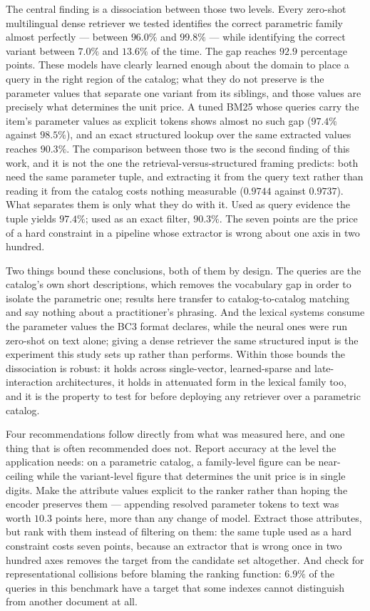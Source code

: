 \documentclass[preprint,12pt]{elsarticle}
\begin{document}
The central finding is a dissociation between those two levels. Every zero-shot multilingual dense retriever we tested identifies the correct parametric family almost perfectly --- between $96.0\%$ and $99.8\%$ --- while identifying the correct variant between $7.0\%$ and $13.6\%$ of the time. The gap reaches $92.9$ percentage points. These models have clearly learned enough about the domain to place a query in the right region of the catalog; what they do not preserve is the parameter values that separate one variant from its siblings, and those values are precisely what determines the unit price. A tuned BM25 whose queries carry the item's parameter values as explicit tokens shows almost no such gap ($97.4\%$ against $98.5\%$), and an exact structured lookup over the same extracted values reaches $90.3\%$. The comparison between those two is the second finding of this work, and it is not the one the retrieval-versus-structured framing predicts: both need the same parameter tuple, and extracting it from the query text rather than reading it from the catalog costs nothing measurable ($0.9744$ against $0.9737$). What separates them is only what they do with it. Used as query evidence the tuple yields $97.4\%$; used as an exact filter, $90.3\%$. The seven points are the price of a hard constraint in a pipeline whose extractor is wrong about one axis in two hundred.

Two things bound these conclusions, both of them by design. The queries are the catalog's own short descriptions, which removes the vocabulary gap in order to isolate the parametric one; results here transfer to catalog-to-catalog matching and say nothing about a practitioner's phrasing. And the lexical systems consume the parameter values the BC3 format declares, while the neural ones were run zero-shot on text alone; giving a dense retriever the same structured input is the experiment this study sets up rather than performs. Within those bounds the dissociation is robust: it holds across single-vector, learned-sparse and late-interaction architectures, it holds in attenuated form in the lexical family too, and it is the property to test for before deploying any retriever over a parametric catalog.


Four recommendations follow directly from what was measured here, and one thing that is often recommended does not. Report accuracy at the level the application needs: on a parametric catalog, a family-level figure can be near-ceiling while the variant-level figure that determines the unit price is in single digits. Make the attribute values explicit to the ranker rather than hoping the encoder preserves them --- appending resolved parameter tokens to text was worth $10.3$ points here, more than any change of model. Extract those attributes, but rank with them instead of filtering on them: the same tuple used as a hard constraint costs seven points, because an extractor that is wrong once in two hundred axes removes the target from the candidate set altogether. And check for representational collisions before blaming the ranking function: $6.9\%$ of the queries in this benchmark have a target that some indexes cannot distinguish from another document at all.
\end{document}
